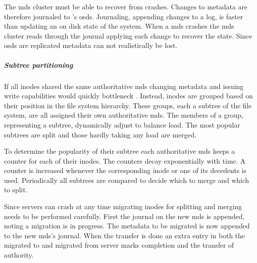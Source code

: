 The \ac{mds} cluster must be able to recover from crashes. Changes to metadata are therefore journaled to \ceph{}'s \acfp{osd}. Journaling, appending changes to a log, is faster than updating an on disk state of the system. When a \ac{mds} crashes the \ac{mds} cluster reads through the journal applying each change to recover the state. Since \acp{osd} are replicated metadata can not realistically be lost.
%
\subparagraph{Subtree partitioning} \label{sec:subtree}
If all inodes shared the same authoritative \ac{mds} changing metadata and issuing write capabilities would quickly bottleneck \ceph{}. Instead, inodes are grouped based on their position in the file system hierarchy. These groups, each a subtree of the file system, are all assigned their own authoritative \ac{mds}. The members of a group, representing a subtree, dynamically adjust to balance load. The most popular subtrees are split and those hardly taking any load are merged.

To determine the popularity of their subtree each authoritative \ac{mds} keeps a counter for each of their inodes. The counters decay exponentially with time. A counter is increased whenever the corresponding inode or one of its decedents is used. Periodically all subtrees are compared to decide which to merge and which to split.

Since servers can crash at any time migrating inodes for splitting and merging needs to be performed carefully. First the journal on the new \ac{mds} is appended, noting a migration is in progress. The metadata to be migrated is now appended to the new \ac{mds}'s journal. When the transfer is done an extra entry in both the migrated to and migrated from server marks completion and the transfer of authority. 
